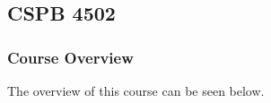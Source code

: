 \clearpage

\renewcommand{\ChapTitle}{\CSPBDM}
\renewcommand{\SectionTitle}{CSPB 4502}

\chapter{\ChapTitle}
\section{\SectionTitle}

\subsection{Course Overview}

The overview of this course can be seen below.

